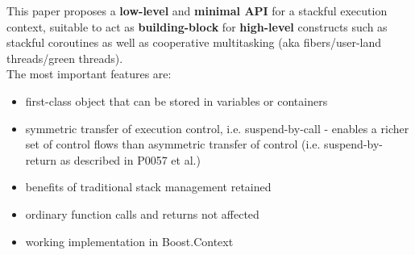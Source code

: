 This paper proposes a {\bfseries low-level} and {\bfseries minimal API} for a
stackful execution context, suitable to act as {\bfseries building-block} for
{\bfseries high-level} constructs such as stackful coroutines as well as
cooperative multitasking (aka fibers/user-land threads/green threads).\\
\newline
The most important features are:
\begin{itemize}
    \item first-class object that can be stored in variables or containers
    \item symmetric transfer of execution control, i.e. suspend-by-call -
          enables a richer set of control flows than asymmetric transfer of
          control (i.e. suspend-by-return as described in P0057\cite{P0057} et al.)
    \item benefits of traditional stack management retained
    \item ordinary function calls and returns not affected
    \item working implementation in Boost.Context\cite{bcontext}
\end{itemize}
